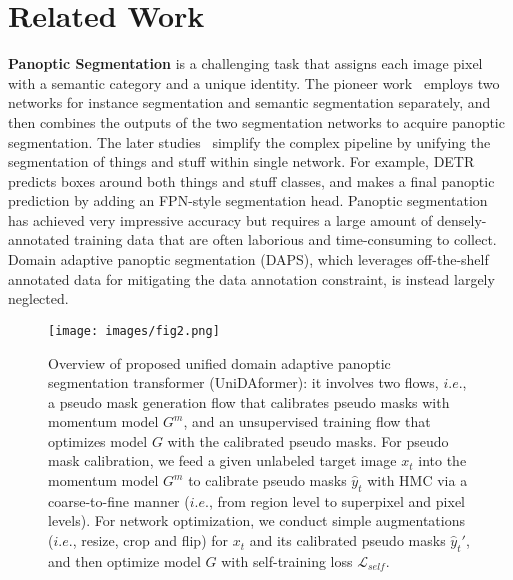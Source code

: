\documentclass[10pt,twocolumn,letterpaper]{article}
\begin{document}
\section{Related Work}


\textbf{Panoptic Segmentation} is a challenging task that assigns each image pixel with a semantic category and a unique identity.
The pioneer work~\cite{kirillov2019panoptic} employs two networks for instance segmentation and semantic segmentation separately, and then combines the outputs of the two segmentation networks to acquire panoptic segmentation.
The later studies~\cite{xiong2019upsnet,kirillov2019panopticfpn,li2019aunet,carion2020detr,cheng2020panoptic,li2021fullypanoptic,wang2021maxdeeplab,cheng2021maskformer,cheng2021masked} simplify the complex pipeline by unifying the segmentation of things and stuff within single network.
For example, DETR~\cite{carion2020detr} predicts boxes around both things and stuff classes, and makes a final panoptic prediction by adding an FPN-style segmentation head.
Panoptic segmentation has achieved very impressive accuracy but requires a large amount of densely-annotated training data that are often laborious and time-consuming to collect. Domain adaptive panoptic segmentation (DAPS), which leverages off-the-shelf annotated data for mitigating the data annotation constraint, is instead largely neglected.

\begin{figure*}[t]
\centering
\texttt{[image: images/fig2.png]}
\caption{
Overview of proposed unified domain adaptive panoptic segmentation transformer (UniDAformer):
it involves two flows, $i.e.$, a pseudo mask generation flow that calibrates pseudo masks with momentum model $G^m$, and an unsupervised training flow that optimizes model $G$ with the calibrated pseudo masks.
For pseudo mask calibration, we feed a given unlabeled target image $x_t$ into the momentum model $G^m$ to calibrate pseudo masks $\hat{y}_t$ with HMC via a coarse-to-fine manner ($i.e.$, from region level to superpixel and pixel levels).
For network optimization, we conduct simple augmentations ($i.e.$, resize, crop and flip) for $x_t$ and its calibrated pseudo masks $\hat{y}_t{'}$, and then optimize model $G$ with self-training loss $\mathcal{L}_{self}$.
}
\label{fig:stru}
\end{figure*}
\end{document}
